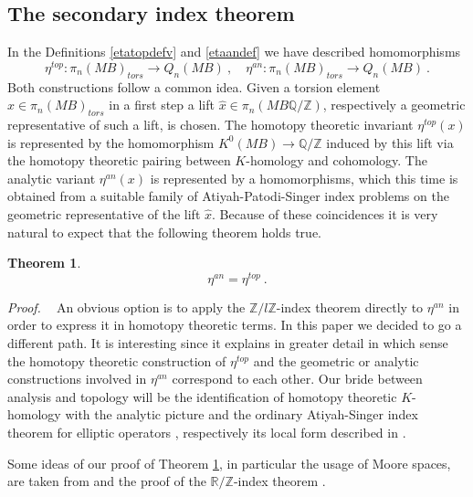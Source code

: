 \documentclass[12pt]{article}
\newtheorem{theorem}{Theorem}[section]
\newcommand{\proof}{{\it Proof.$\:\:\:\:$}}
\newcommand{\Z}{{\mathbb{Z}}}
\newcommand{\Q}{{\mathbb{Q}}}
\newcommand{\R}{{\mathbb{R}}}
\begin{document}
 
\subsection{The secondary index theorem}\label{theproof}

In the Definitions \ref{etatopdefv} and  \ref{etaandef}
we have described  homomorphisms
$$\eta^{top}:\pi_{n}(MB )_{tors}\to Q_{n}(MB)\ ,\quad \eta^{an}:\pi_{n}(MB )_{tors}\to Q_{n}(MB)\ .$$ 
Both constructions follow a common idea. Given a torsion element
$x\in \pi_{n}(MB)_{tors}$ in a first step a lift $\hat x\in \pi_{n}(MB\Q/\Z)$, respectively a geometric representative of such a lift, is chosen. The homotopy theoretic invariant $\eta^{top}(x)$ is represented by the homomorphism
$K^{0}(MB)\to \Q/\Z$ induced by this lift via the homotopy theoretic pairing between $K$-homology and cohomology. The analytic variant $\eta^{an}(x)$ is represented by a  homomorphisms, which this time is obtained  from
a suitable family of Atiyah-Patodi-Singer index problems on the geometric representative of the lift $\hat x$. Because of these coincidences it is very natural to expect that the following theorem holds true.
\begin{theorem}\label{indthm}
$$\eta^{an}=\eta^{top}\ .$$
\end{theorem}
\proof 
An obvious option is to apply the $\Z/l\Z$-index theorem \cite{MR1144425} directly to $\eta^{an}$ in order to express it in homotopy theoretic terms. 
In this paper we decided to go a different path. It is interesting since it  explains in greater detail in which sense the homotopy theoretic construction of $\eta^{top}$ and the geometric or analytic constructions
involved in $\eta^{an}$  correspond to each other.  Our bride between analysis and topology will be
the identification of homotopy theoretic $K$-homology with the analytic picture \cite{MR679698} and 
the ordinary Atiyah-Singer index theorem for elliptic operators \cite{MR0236950}, respectively its local form described in \cite[Ch. IV]{MR2273508}. 

Some ideas of our proof of Theorem 
\ref{indthm}, in particular  the usage of Moore spaces, are taken from  \cite{MR1144425} and the proof of the $\R/\Z$-index theorem \cite[Thm 5.3]{MR0397799}.
\end{document}
